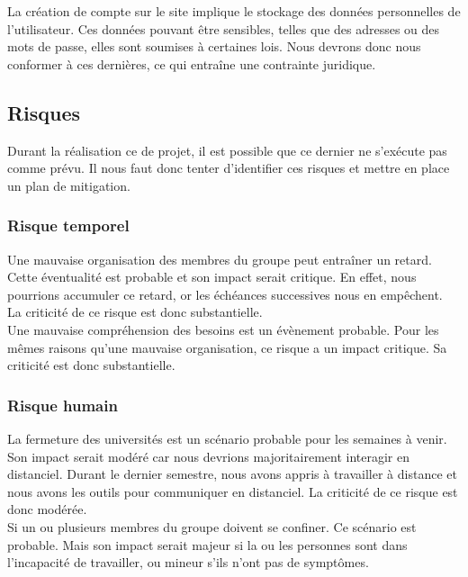 \documentclass[a4paper,11pt]{article}
\begin{document}
La création de compte sur le site implique le stockage des données personnelles de l’utilisateur. Ces
données pouvant être sensibles, telles que des adresses ou des mots de passe, elles sont soumises à
certaines lois. Nous devrons donc nous conformer à ces dernières, ce qui entraîne une contrainte
juridique.\\

\subsection{Risques}

Durant la réalisation ce de projet, il est possible que ce dernier ne s’exécute pas comme prévu. Il nous
faut donc tenter d’identifier ces risques et mettre en place un plan de mitigation.\\

\subsubsection{Risque temporel}

Une mauvaise organisation des membres du groupe peut entraîner un retard. Cette éventualité est
probable et son impact serait critique. En effet, nous pourrions accumuler ce retard, or les échéances
successives nous en empêchent. La criticité de ce risque est donc substantielle.\\

Une mauvaise compréhension des besoins est un évènement probable. Pour les mêmes raisons
qu'une mauvaise organisation, ce risque a un impact critique. Sa criticité est donc substantielle.\\

\subsubsection{Risque humain}

La fermeture des universités est un scénario probable pour les semaines à venir. Son impact serait
modéré car nous devrions majoritairement interagir en distanciel. Durant le dernier semestre, nous
avons appris à travailler à distance et nous avons les outils pour communiquer en distanciel. La criticité
de ce risque est donc modérée.\\

Si un ou plusieurs membres du groupe doivent se confiner. Ce scénario est probable. Mais son impact
serait majeur si la ou les personnes sont dans l’incapacité de travailler, ou mineur s’ils n’ont pas de
symptômes.\\
\end{document}
